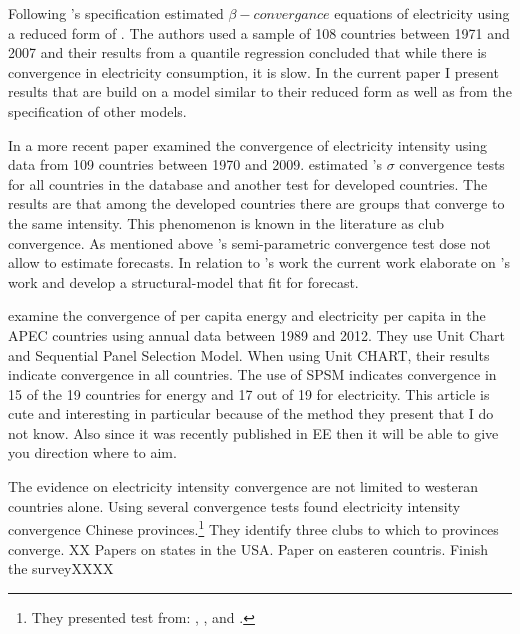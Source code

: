\documentclass[]{amsart}
\begin{document}
\bigskip

Following \cite{MiketaMulder2005}'s specification \cite{MohammadiRam2012} estimated $\beta-convergance$ equations of electricity using a reduced form of \cite{sala1996classical}. The authors used a sample of 108 countries between 1971 and 2007 and their results from a quantile regression concluded that while there is convergence in electricity consumption, it is slow. In the current paper I present results that are build on a model similar to their reduced form as well as from the specification of other models. 

\bigskip

In a more recent paper \cite{Kim2015} examined the convergence of electricity intensity using data from 109 countries between 1970 and 2009. \cite{Kim2015} estimated \cite{PhillipsSul2007}'s $\sigma$ convergence tests for all countries in the database and another test for developed countries. The results are that among the developed countries there are groups that converge to the same intensity. This phenomenon is known in the literature as club convergence. As mentioned above \cite{PhillipsSul2007}'s semi-parametric convergence test dose not allow to estimate forecasts. In relation to \cite{Kim2015}'s work the current work elaborate on \cite{PhillipsSul2007}'s work and develop a structural-model that fit for forecast.

\bigskip

\cite{LeChangPark2017} examine the convergence of per capita energy and electricity per capita in the APEC countries using annual data between 1989 and 2012. They use Unit Chart and Sequential Panel Selection Model. When using Unit CHART, their results indicate convergence in all countries. The use of SPSM indicates convergence in 15 of the 19 countries for energy and 17 out of 19 for electricity. This article is cute and interesting in particular because of the method they present that I do not know. Also since it was recently published in EE then it will be able to give you direction where to aim.

\bigskip

The evidence on electricity intensity convergence are not limited to westeran countries alone. Using several convergence tests \cite{HerreriasLiu2013} found  electricity intensity convergence Chinese provinces.\footnote{They presented test from: \cite{lee2003minimum}, \cite{kapetanios2003testing}, \cite{PhillipsSul2007} and \cite{hansen2000sample}.} They identify three clubs to which to provinces converge. XX Papers on states in the USA. Paper on easteren countris. Finish the surveyXXXX
\end{document}
